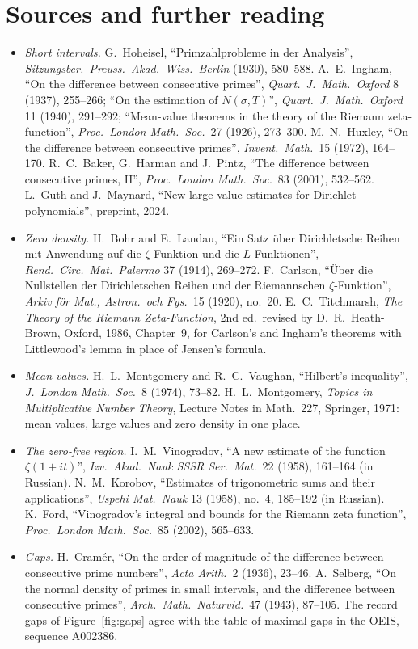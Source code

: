 \section*{Sources and further reading}

\begin{itemize}
\item \emph{Short intervals.} G.~Hoheisel, ``Primzahlprobleme in der Analysis'', \emph{Sitzungsber.\ Preuss.\ Akad.\ Wiss.\ Berlin} (1930), 580--588. A.~E.~Ingham, ``On the difference between consecutive primes'', \emph{Quart.\ J.\ Math.\ Oxford} 8 (1937), 255--266; ``On the estimation of $N(\sigma,T)$'', \emph{Quart.\ J.\ Math.\ Oxford} 11 (1940), 291--292; ``Mean-value theorems in the theory of the Riemann zeta-function'', \emph{Proc.\ London Math.\ Soc.}\ 27 (1926), 273--300. M.~N.~Huxley, ``On the difference between consecutive primes'',
\emph{Invent.\ Math.}\ 15 (1972), 164--170. R.~C.~Baker, G.~Harman and J.~Pintz, ``The difference between consecutive primes, II'', \emph{Proc.\ London Math.\ Soc.}\ 83 (2001), 532--562. L.~Guth and J.~Maynard, ``New large value estimates for Dirichlet polynomials'', preprint, 2024.
\item \emph{Zero density.} H.~Bohr and E.~Landau, ``Ein Satz \"uber Dirichletsche Reihen mit Anwendung auf die $\zeta$-Funktion und die $L$-Funktionen'', \emph{Rend.\ Circ.\ Mat.\ Palermo} 37 (1914), 269--272. F.~Carlson, ``\"Uber die Nullstellen der Dirichletschen Reihen und der Riemannschen $\zeta$-Funktion'', \emph{Arkiv f\"or Mat., Astron.\ och Fys.}\ 15 (1920), no.~20.
E.~C.~Titchmarsh, \emph{The Theory of the Riemann Zeta-Function}, 2nd ed.\ revised by D.~R.~Heath-Brown, Oxford, 1986, Chapter~9, for Carlson's and Ingham's theorems with Littlewood's lemma in place of Jensen's formula.
\item \emph{Mean values.} H.~L.~Montgomery and R.~C.~Vaughan, ``Hilbert's inequality'', \emph{J.\ London Math.\ Soc.}\ 8 (1974), 73--82. H.~L.~Montgomery, \emph{Topics in Multiplicative Number Theory}, Lecture Notes in Math.\ 227, Springer, 1971: mean values, large values and zero density in one place.
\item \emph{The zero-free region.} I.~M.~Vinogradov, ``A new estimate of the function $\zeta(1+it)$'', \emph{Izv.\ Akad.\ Nauk SSSR Ser.\ Mat.}\ 22 (1958), 161--164 (in Russian). N.~M.~Korobov, ``Estimates of trigonometric sums and their applications'', \emph{Uspehi Mat.\ Nauk} 13 (1958), no.~4, 185--192 (in Russian). K.~Ford, ``Vinogradov's integral and bounds for the Riemann zeta function'',
\emph{Proc.\ London Math.\ Soc.}\ 85 (2002), 565--633.
\item \emph{Gaps.} H.~Cram\'er, ``On the order of magnitude of the difference between consecutive prime numbers'', \emph{Acta Arith.}\ 2 (1936), 23--46. A.~Selberg, ``On the normal density of primes in small intervals, and the difference between consecutive primes'', \emph{Arch.\ Math.\ Naturvid.}\ 47 (1943), 87--105. The record gaps of Figure~\ref{fig:gaps} agree with the table of maximal gaps in the OEIS, sequence A002386.
\end{itemize}
